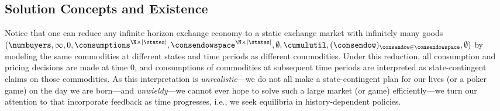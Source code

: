 

\subsection{Solution Concepts and Existence}
\label{sec:inf_eqa}

Notice that one can reduce any infinite horizon  exchange economy to a static exchange market with infinitely many goods $(\numbuyers, \infty, 0, \consumptions^{\N \times |\states|}, \consendowspace^{\N \times |\states| }, \emptyset, \cumulutil, (\consendow)_{\consendow \in \consendowspace}, \emptyset)$ by modeling the same commodities at different states and time periods as different commodities. 
Under this reduction, all consumption and pricing decisions are made at time $0$, and consumptions of commodities at subsequent time periods are interpreted as state-contingent claims on those commodities. 
As this interpretation is \emph{unrealistic}---we do not all make a state-contingent plan for our lives (or a poker game) on the day we are born---and \emph{unwieldy}---we cannot ever hope to solve such a large market (or game) efficiently---we turn our attention to  that incorporate feedback as time progresses, i.e., we seek equilibria in history-dependent policies. \fi

